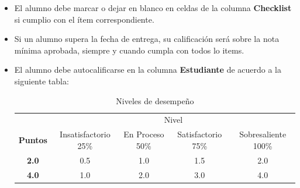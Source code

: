 \documentclass{article}
\begin{document}
\begin{itemize}
	\item El alumno debe marcar o dejar en blanco en celdas de la columna \textbf{Checklist} si cumplio con el ítem correspondiente.
	\item Si un alumno supera la fecha de entrega,  su calificación será sobre la nota mínima aprobada, siempre y cuando cumpla con todos lo items.
	\item El alumno debe autocalificarse en la columna \textbf{Estudiante} de acuerdo a la siguiente tabla:

	      \begin{table}[ht]
		      \caption{Niveles de desempeño}
		      \begin{center}
			      \begin{tabular}{ccccc}
				      \hline
				                      & \multicolumn{4}{c}{Nivel}                                                              \\
				      \cline{1-5}
				      \textbf{Puntos} & Insatisfactorio 25\%      & En Proceso 50\% & Satisfactorio 75\% & Sobresaliente 100\% \\
				      \textbf{2.0}    & 0.5                       & 1.0             & 1.5                & 2.0                 \\
				      \textbf{4.0}    & 1.0                       & 2.0             & 3.0                & 4.0                 \\
				      \hline
			      \end{tabular}
		      \end{center}
	      \end{table}

\end{itemize}
\end{document}
